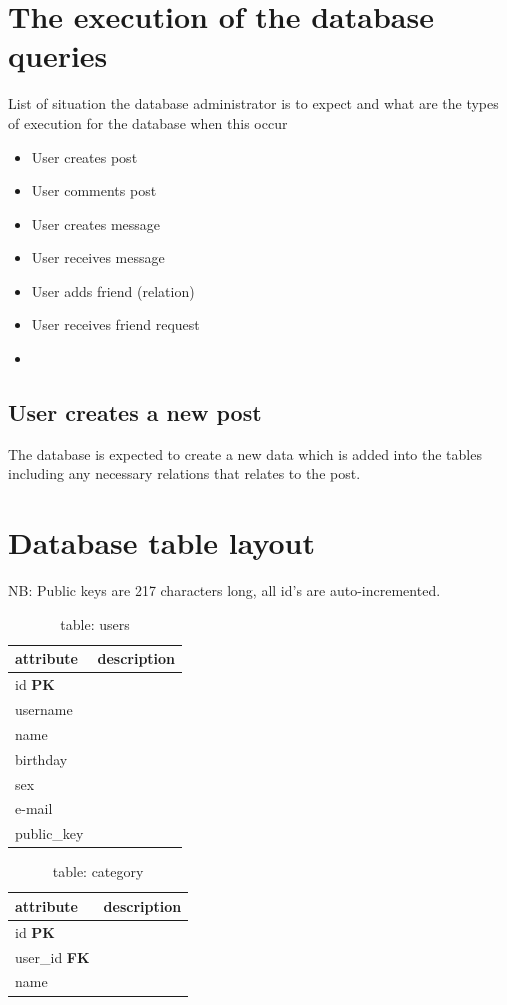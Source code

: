 \section{The execution of the database queries}
List of situation the database administrator is to expect and what are the types of execution for the database when this occur
\begin{itemize}
\item User creates post
\item User comments post
\item User creates message
\item User receives message
\item User adds friend (relation)
\item User receives friend request
\item 
\end{itemize}

\subsection{User creates a new post}
The database is expected to create a new data which is added into the tables including any necessary relations that relates to the post.

\section{Database table layout}
NB: Public keys are 217 characters long, all id's are auto-incremented.

\begin{table}[h]
    \centering
    \begin{tabular}{ll}
    attribute      & description\\ \hline
    id \textbf{PK} & \\
    username       & \\
    name           & \\
    birthday       & \\
    sex            & \\
    e-mail         & \\
    public\_key    & \\
    \end{tabular}
    \caption{table: users}
\end{table}

\begin{table}[h]
    \centering
    \begin{tabular}{ll}
    attribute            & description\\ \hline
    id \textbf{PK}       & \\
    user\_id \textbf{FK} & \\
    name                 & \\
    \end{tabular}
    \caption{table: category}
\end{table}


